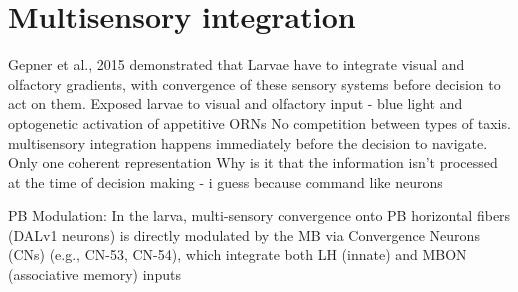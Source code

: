 \section{Multisensory integration}
 Gepner et al., 2015 demonstrated that Larvae  have to integrate visual and olfactory gradients, with convergence of these sensory systems before decision to act on them. 
 Exposed larvae to visual and olfactory input - blue light and optogenetic activation of appetitive ORNs
No competition between types of taxis. 
multisensory integration happens immediately before the decision to navigate. Only one coherent representation
Why is it that the information isn’t processed at the time of decision making  - i guess because command like neurons 


 PB Modulation: In the larva, multi-sensory convergence onto PB horizontal fibers (DALv1 neurons) is directly modulated by the MB via Convergence Neurons (CNs) (e.g., CN-53, CN-54), which integrate both LH (innate) and MBON (associative memory) inputs